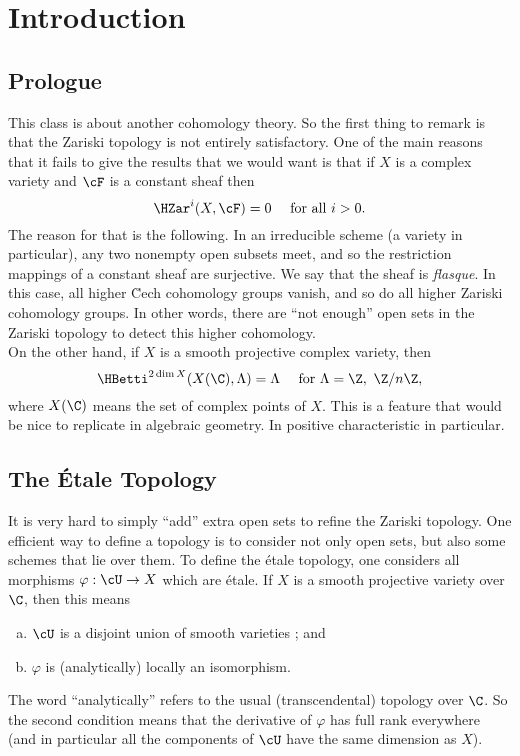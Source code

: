 \section*{Introduction}%
\subsection{Prologue}

This class is about another cohomology theory. So the first thing to remark is that the Zariski topology is not entirely satisfactory. One of the main reasons that it fails to give the results that we would want is that if $X$ is a complex variety and $\cF$ is a constant sheaf then
$$
\HZar^i ( X, \cF) = 0 \quad \text{ for all } i>0.
$$
The reason for that is the following. In an irreducible scheme (a variety in particular), any two nonempty open subsets meet, and so the restriction mappings of a constant sheaf are surjective. We say that the sheaf is \emph{flasque}. In this case, all higher \u Cech cohomology groups vanish, and so do all higher Zariski cohomology groups. In other words, there are ``not enough'' open sets in the Zariski topology to detect this higher cohomology.
\\
On the other hand, if $X$ is a smooth projective complex variety, then
$$
\HBetti^{2 \dim X} (X (\C), \Lambda) = \Lambda \quad \text{ for } \Lambda = \Z, \ \Z/n\Z,
$$
where $X(\C)$ means the set of complex points of $X$. This is a feature that would be nice to replicate in algebraic geometry. In positive characteristic in particular.

\subsection{The \'Etale Topology}

It is very hard to simply ``add'' extra open sets to refine the Zariski topology. One efficient way to define a topology is to consider not only open sets, but also some schemes that lie over them. To define the \'etale topology, one considers all morphisms $\varphi: \cU \to X$ which are \'etale.  If $X$ is a smooth projective variety over $\C$, then this means 
\begin{enumerate}[(a)]
\item $\cU$ is a disjoint union of smooth varieties ; and
\item $\varphi$ is (analytically) locally an isomorphism.
\end{enumerate}
The word ``analytically'' refers to the usual (transcendental) topology over $\C$. So the second condition means that the derivative of $\varphi$ has full rank everywhere (and in particular all the components of $\cU$ have the same dimension as $X$).

